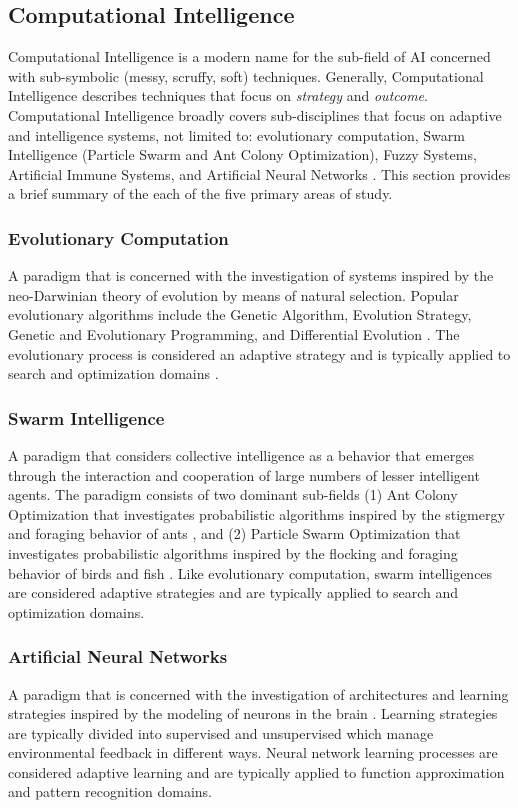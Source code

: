 \subsection{Computational Intelligence}
\label{sec:computationl_intelligence}
Computational Intelligence is a modern name for the sub-field of AI concerned with sub-symbolic (messy, scruffy, soft) techniques. Generally, Computational Intelligence describes techniques that focus on \emph{strategy} and \emph{outcome}. 
Computational Intelligence broadly covers sub-disciplines that focus on adaptive and intelligence systems, not limited to: evolutionary computation, Swarm Intelligence (Particle Swarm and Ant Colony Optimization), Fuzzy Systems, Artificial Immune Systems, and Artificial Neural Networks \cite{Engelbrecht2007, Pedrycz1997}. This section provides a brief summary of the each of the five primary areas of study.

\subsubsection{Evolutionary Computation} 
A paradigm that is concerned with the investigation of systems inspired by the neo-Darwinian theory of evolution by means of natural selection. Popular evolutionary algorithms include the Genetic Algorithm, Evolution Strategy, Genetic and Evolutionary Programming, and Differential Evolution \cite{Baeck2000, Baeck2000a}. The evolutionary process is considered an adaptive strategy and is typically applied to search and optimization domains \cite{Goldberg1989, Holland1975}.

\subsubsection{Swarm Intelligence} 
A paradigm that considers collective intelligence as a behavior that emerges through the interaction and cooperation of large numbers of lesser intelligent agents. The paradigm consists of two dominant sub-fields (1) Ant Colony Optimization that investigates probabilistic algorithms inspired by the stigmergy and foraging behavior of ants \cite{Bonabeau1999, Dorigo2004}, and (2) Particle Swarm Optimization that investigates probabilistic algorithms inspired by the flocking and foraging behavior of birds and fish \cite{Shi2001}. Like evolutionary computation, swarm intelligences are considered adaptive strategies and are typically applied to search and optimization domains.

\subsubsection{Artificial Neural Networks}
A paradigm that is concerned with the investigation of architectures and learning strategies inspired by the modeling of neurons in the brain \cite{Bishop1995}. Learning strategies are typically divided into supervised and unsupervised which manage environmental feedback in different ways. Neural network learning processes are considered adaptive learning and are typically applied to function approximation and pattern recognition domains.

